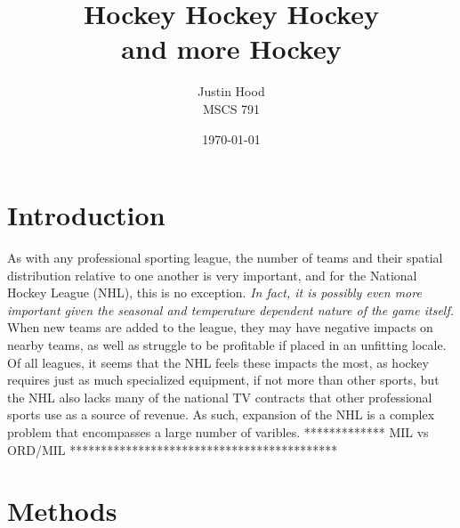 \documentclass[11pt]{report}            %
\title{\bf Hockey Hockey Hockey\\
\large and more Hockey}  %
\author{Justin Hood\\
MSCS 791}              %
\date{\today}                           %
\begin{document}
\maketitle                              %
\setcounter{page}{2}                    %
\tableofcontents                        %
\newpage
\section*{Introduction}                %
As with any professional sporting league, the number of teams and their spatial distribution relative to one another is very important, and for the National Hockey League (NHL), this is no exception. \textit{In fact, it is possibly even more important given the seasonal and temperature dependent nature of the game itself.} When new teams are added to the league, they may have negative impacts on nearby teams, as well as struggle to be profitable if placed in an unfitting locale. Of all leagues, it seems that the NHL feels these impacts the most, as hockey requires just as much specialized equipment, if not more than other sports, but the NHL also lacks many of the national TV contracts that other professional sports use as a source of revenue\cite{light}. As such, expansion of the NHL is a complex problem that encompasses a large number of varibles. 
************* MIL vs ORD/MIL *******************************************
\section*{Methods}
\end{document}
